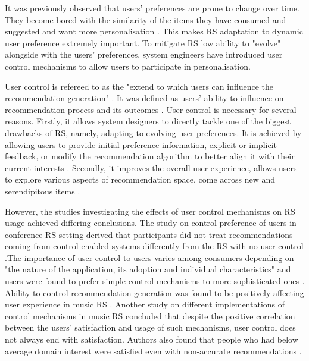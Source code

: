\documentclass[a4paper,12pt]{article}
\begin{document}
It was previously observed that users' preferences are prone to change over time. They become bored with the similarity of the items they have consumed and suggested and want more personalisation \citep{songWhenHowDiversify2019}. This makes RS adaptation to dynamic user preference extremely important. To mitigate RS low ability to "evolve" alongside with the users' preferences, system engineers have introduced user control mechanisms to allow users to participate in personalisation. 

User control is refereed to as the "extend to which users can influence the recommendation generation" \citep{jannach2019explanations}. It was defined as users' ability to influence on recommendation process and its outcomes \citep{knijnenburgExplainingUserExperience2012}. User control is necessary for several reasons. Firstly, it allows system designers to directly tackle one of the biggest drawbacks of RS, namely, adapting to evolving user preferences. It is achieved by allowing users to provide initial preference information, explicit or implicit feedback, or modify the recommendation algorithm to better align it with their current interests \citep{tintarev2015explaining}. Secondly, it improves the overall user experience, allows users to explore various aspects of recommendation space, come across new and serendipitous items \citep{tintarev2015explaining,kotkovSurveySerendipityRecommender2016}. 


However, the studies investigating the effects of user control mechanisms on RS usage achieved differing conclusions. The study on control preference of users in conference RS setting derived  that participants did not treat recommendations coming from control enabled systems differently from the RS with no user control  \citep{jameson2002pros}.The importance of user control to users varies among consumers depending on "the nature of the application, its adoption and individual characteristics" and users were found to prefer simple control mechanisms to more sophisticated ones \citep{knijnenburg2011each, knijnenburgExplainingUserExperience2012}. Ability to control recommendation generation was found to be positively affecting user experience in music RS \citep{bostandjiev2012tasteweights, knijnenburgExplainingUserExperience2012}. Another study on different implementations of control mechanisms in music RS concluded that despite the positive correlation between the users' satisfaction and usage of such mechanisms, user control does not always end with satisfaction. Authors also found that people who had below average domain interest were satisfied even with non-accurate recommendations \citep{hijikataStudyUserIntervention2014}.
\end{document}

